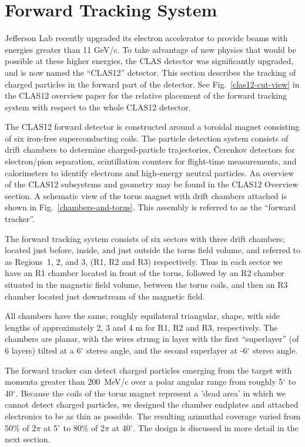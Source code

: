 \section{Forward Tracking System}
\label{overview}

Jefferson Lab recently upgraded its electron accelerator to provide beams with 
energies greater than 11 GeV/c.  To take advantage of new physics that would 
be possible at these higher energies, the CLAS detector was significantly
upgraded, and is now named the ``CLAS12'' detector.  This section describes
the tracking of charged particles in the forward part of the detector.
See Fig.~\ref{clas12-cut-view} in the CLAS12 overview paper for the relative placement
of the forward tracking system with respect to the whole CLAS12 detector.


The CLAS12 forward detector is constructed around a toroidal magnet consisting of six 
iron-free superconducting coils.  The particle detection system consists of drift 
chambers to determine charged-particle trajectories, {\v C}erenkov detectors 
for electron/pion separation, scintillation counters for flight-time 
measurements, and calorimeters to identify electrons and high-energy neutral 
particles.  An overview of the CLAS12 subsystems and geometry may be found in the 
CLAS12 Overview section.  A schematic view of the torus magnet with drift chambers
attached is shown in Fig.~\ref{chambers-and-torus}.   This assembly is referred to
as the ``forward tracker''. 

The forward tracking system consists of six sectors with three drift
chambers; located just before, inside, 
and just outside the torus field volume, and referred to as Regions~1, 2, 
and 3, (R1, R2 and R3) respectively.  Thus in each sector we have an R1 chamber located
in front of the torus, followed by an R2 chamber situated in the magnetic
field volume, between the torus coils, and then an R3 chamber located just
downstream of the magnetic field.

All chambers have the same, roughly equilateral triangular, shape, with
side lengths of approximately 2, 3 and 4 m for R1, R2 and R3, respectively.
The chambers are planar, with the wires strung in layer with the first 
``superlayer'' (of 6 layers)
tilted at a 6$^\circ$ stereo angle, and the second superlayer at -6$^\circ$ stereo
angle.  

The forward tracker can detect charged particles emerging from the target with
momenta greater than 200~MeV/c over a polar angular range from roughly 5$^{\circ}$ to 
40$^{\circ}$.  Because the coils of the torus magnet represent a 'dead area'
in which we cannot detect charged particles, we designed the chamber endplates
and attached electronics to be as thin as possible.  The resulting azimuthal
coverage varied from 50\% of 2$\pi$ at 5$^{\circ}$ to 80\% of 2$\pi$ at 40$^{\circ}$.
The design is discussed in more detail in the next section.

